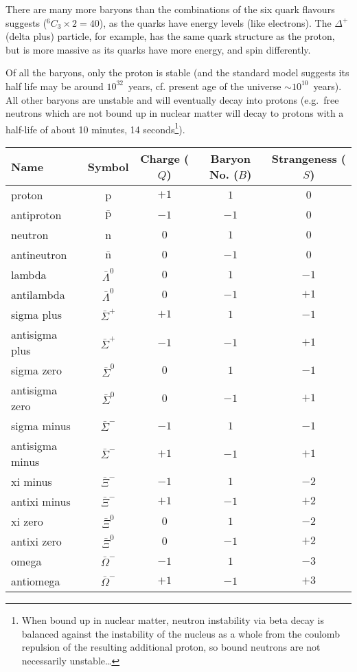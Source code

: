\documentclass[a4paper,12pt]{article}
\begin{document}
There are many more baryons than the combinations of the six quark flavours suggests ($^{6}C_{3}\times 2=40$), as the quarks have energy levels (like electrons).  The $\Delta^{+}$ (delta plus) particle, for example, has the same quark structure as the proton, but is more massive as its quarks have more energy, and spin differently.

Of all the baryons, only the proton is stable (and the standard model suggests its half life may be around $10^{32}$~years, cf. present age of the universe $\sim 10^{10}$~years).  All other baryons are unstable and will eventually decay into protons (e.g.\ free neutrons which are not bound up in nuclear matter will decay to protons with a half-life of about 10 minutes, 14 seconds\footnote{When bound up in nuclear matter, neutron instability via beta decay is balanced against the instability of the nucleus as a whole from the coulomb repulsion of the resulting additional proton, so bound neutrons are not necessarily unstable\ldots}).

\noindent \begin{tabular}{lcccc}
\hline
\hline
Name & Symbol & Charge ($Q$) & Baryon No. ($B$) & Strangeness ($S$)\\
\hline
proton & p & $+1$ & $1$ & $0$ \\
antiproton & $\bar{\mathrm{p}}$ & $-1$ & $-1$ & $0$ \\
neutron & n & $0$ & $1$ & $0$ \\
antineutron & $\bar{\mathrm{n}}$ & $0$ & $-1$ & $0$ \\
lambda & $\bar{\Lambda}^{0}$ & $0$ & $1$ & $-1$ \\
antilambda & $\bar{\Lambda}^{0}$ & $0$ & $-1$ & $+1$ \\
sigma plus & $\bar{\Sigma}^{+}$ & $+1$ & $1$ & $-1$ \\
antisigma plus & $\bar{\Sigma}^{+}$ & $-1$ & $-1$ & $+1$ \\
sigma zero & $\bar{\Sigma}^{0}$ & $0$ & $1$ & $-1$ \\
antisigma zero & $\bar{\Sigma}^{0}$ & $0$ & $-1$ & $+1$ \\
sigma minus & $\bar{\Sigma}^{-}$ & $-1$ & $1$ & $-1$ \\
antisigma minus & $\bar{\Sigma}^{-}$ & $+1$ & $-1$ & $+1$ \\
xi minus & $\bar{\Xi}^{-}$ & $-1$ & $1$ & $-2$ \\
antixi minus & $\bar{\Xi}^{-}$ & $+1$ & $-1$ & $+2$ \\
xi zero & $\bar{\Xi}^{0}$ & $0$ & $1$ & $-2$ \\
antixi zero & $\bar{\Xi}^{0}$ & $0$ & $-1$ & $+2$ \\
omega & $\bar{\Omega}^{-}$ & $-1$ & $1$ & $-3$ \\
antiomega & $\bar{\Omega}^{-}$ & $+1$ & $-1$ & $+3$ \\
\hline
\hline
\end{tabular}
\end{document}
